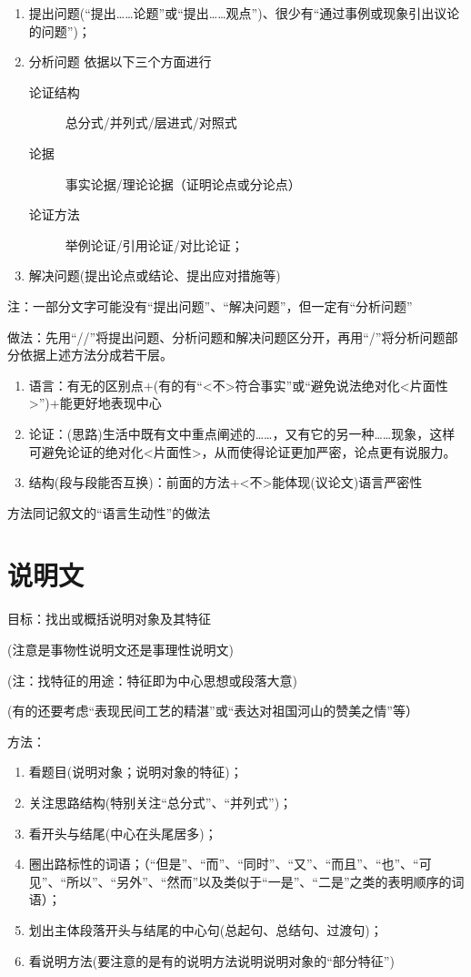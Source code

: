 \begin{enumerate}
\item 提出问题(``提出\ldots{}\ldots{}论题''或``提出\ldots{}\ldots{}观点'')、很少有``通过事例或现象引出议论的问题'')；
\item 分析问题
依据以下三个方面进行
\begin{description}
\item[论证结构]总分式/并列式/层进式/对照式
\item[论据]事实论据/理论论据（证明论点或分论点）
\item[论证方法]举例论证/引用论证/对比论证；
\end{description}
\item 解决问题(提出论点或结论、提出应对措施等)
\end{enumerate}
注：一部分文字可能没有``提出问题''、``解决问题''，但一定有``分析问题''

做法：先用``//''将提出问题、分析问题和解决问题区分开，再用``/''将分析问题部分依据上述方法分成若干层。

\begin{enumerate}
\item 语言：有无的区别点+(有的有``<不>符合事实''或``避免说法绝对化<片面性>'')+能更好地表现中心
\item 论证：(思路)生活中既有文中重点阐述的\ldots{}\ldots{}，又有它的另一种\ldots{}\ldots{}现象，这样可避免论证的绝对化<片面性>，从而使得论证更加严密，论点更有说服力。
\item 结构(段与段能否互换)：前面的方法+<不>能体现(议论文)语言严密性
\end{enumerate}

  方法同记叙文的``语言生动性''的做法

\section{说明文}

目标：找出或概括说明对象及其特征

(注意是事物性说明文还是事理性说明文)

(注：找特征的用途：特征即为中心思想或段落大意)

(有的还要考虑``表现民间工艺的精湛''或``表达对祖国河山的赞美之情''等）

方法：\begin{enumerate}\item 看题目(说明对象；说明对象的特征)；
        \item 关注思路结构(特别关注``总分式''、``并列式'')；
        \item 看开头与结尾(中心在头尾居多)；
        \item 圈出路标性的词语；（``但是''、``而''、``同时''、``又''、``而且''、``也''、``可见''、``所以''、``另外''、``然而''以及类似于``一是''、``二是''之类的表明顺序的词语）；
        \item 划出主体段落开头与结尾的中心句(总起句、总结句、过渡句)；
        \item 看说明方法(要注意的是有的说明方法说明说明对象的``部分特征'')\end{enumerate}

